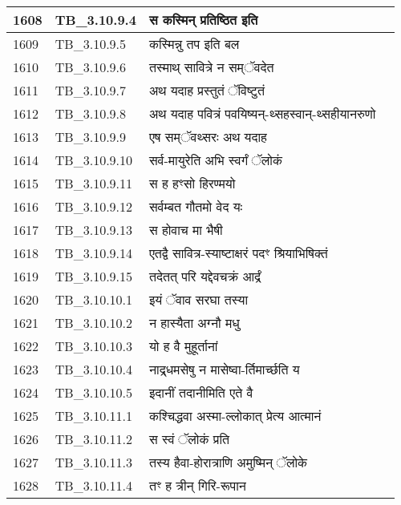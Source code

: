 \documentclass[17pt]{extarticle}
\begin{document}
\begin{longtable}{||p{0.4in}||p{0.9in}||p{4.0in}||p{0.9in}||}
            1608 & TB\_3.10.9.4 & स कस्मिन् प्रतिष्ठित इति &      \\
        \hline
            1609 & TB\_3.10.9.5 & कस्मिन्नु तप इति बल &      \\
        \hline
            1610 & TB\_3.10.9.6 & तस्माथ् सावित्रे न सम्ॅवदेत &      \\
        \hline
            1611 & TB\_3.10.9.7 & अथ यदाह प्रस्तुतं ॅविष्टुतं &      \\
        \hline
            1612 & TB\_3.10.9.8 & अथ यदाह पवित्रं पवयिष्यन्{-}थ्सहस्वान्{-}थ्सहीयानरुणो &      \\
        \hline
            1613 & TB\_3.10.9.9 & एष सम्ॅवथ्सरः अथ यदाह &      \\
        \hline
            1614 & TB\_3.10.9.10 & सर्व{-}मायुरेति अभि स्वर्गं ॅलोकं &      \\
        \hline
            1615 & TB\_3.10.9.11 & स ह हꣳसो हिरण्मयो &      \\
        \hline
            1616 & TB\_3.10.9.12 & सर्वम्बत गौतमो वेद यः &      \\
        \hline
            1617 & TB\_3.10.9.13 & स होवाच मा भैषी &      \\
        \hline
            1618 & TB\_3.10.9.14 & एतद्वै सावित्र{-}स्याष्टाक्षरं पदꣳ श्रियाभिषिक्तं &      \\
        \hline
            1619 & TB\_3.10.9.15 & तदेतत् परि यद्देवचक्रं आर्द्रं &      \\
        \hline
            1620 & TB\_3.10.10.1 & इयं ॅवाव सरघा तस्या &      \\
        \hline
            1621 & TB\_3.10.10.2 & न हास्यैता अग्नौ मधु &      \\
        \hline
            1622 & TB\_3.10.10.3 & यो ह वै मुहूर्तानां &      \\
        \hline
            1623 & TB\_3.10.10.4 & नाद्र्धमसेषु न मासेष्वा{-}र्तिमार्च्छति य &      \\
        \hline
            1624 & TB\_3.10.10.5 & इदानीं तदानीमिति एते वै &      \\
        \hline
            1625 & TB\_3.10.11.1 & कश्चिद्धवा अस्मा{-}ल्लोकात् प्रेत्य आत्मानं &      \\
        \hline
            1626 & TB\_3.10.11.2 & स स्वं ॅलोकं प्रति &      \\
        \hline
            1627 & TB\_3.10.11.3 & तस्य हैवा{-}होरात्राणि अमुष्मिन् ॅलोके &      \\
        \hline
            1628 & TB\_3.10.11.4 & तꣳ ह त्रीन् गिरि{-}रूपान &      \\

\end{longtable}
\end{document}
